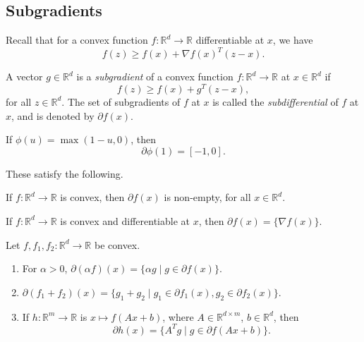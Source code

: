 \documentclass[12pt]{article}
\begin{document}
\subsection{Subgradients}
\label{sub:subg}

Recall that for a convex function $f : \mathbb{R}^d \to \mathbb{R}$ differentiable at $x$, we have
\[
f(z) \geq f(x) + \nabla f(x)^T (z - x).
\]

\begin{definition}
	A vector $g \in \mathbb{R}^d$ is a \emph{subgradient} of a convex function $f : \mathbb{R}^d \to \mathbb{R}$ at $x \in \mathbb{R}^d$ if
	\[
	f(z) \geq f(x) + g^T(z - x),
	\]
	for all $z \in \mathbb{R}^d$. The set of subgradients of $f$ at $x$ is called the \emph{subdifferential} of $f$ at $x$, and is denoted by $\partial f(x)$.
\end{definition}

\begin{exbox}
	If $\phi(u) = \max(1 - u, 0)$, then
	\[
		\partial \phi(1) = [-1, 0].
	\]
\end{exbox}

These satisfy the following.

\begin{proposition}
	If $f : \mathbb{R}^d \to \mathbb{R}$ is convex, then $\partial f(x)$ is non-empty, for all $x \in \mathbb{R}^d$.
\end{proposition}

\begin{proposition}
	If $f : \mathbb{R}^d \to \mathbb{R}$ is convex and differentiable at $x$, then $\partial f(x) = \{ \nabla f(x)\}$.
\end{proposition}

\begin{proposition}
	Let $f, f_1, f_2 : \mathbb{R}^d \to \mathbb{R}$ be convex.
	\begin{enumerate}[\normalfont(i)]
		\item For $\alpha > 0$, $\partial(\alpha f)(x) = \{\alpha g \mid g \in \partial f(x)\}$.
		\item $\partial (f_1 + f_2)(x) = \{g_1 + g_2 \mid g_1 \in \partial f_1(x), g_2 \in \partial f_2(x)\}$.
		\item If $h : \mathbb{R}^m \to \mathbb{R}$ is $x \mapsto f(Ax + b)$, where $A \in \mathbb{R}^{d \times m}$, $b \in \mathbb{R}^d$, then
			\[
				\partial h(x) = \{ A^T g \mid g \in \partial f(Ax + b)\}.
			\]
	\end{enumerate}
\end{proposition}
\end{document}
